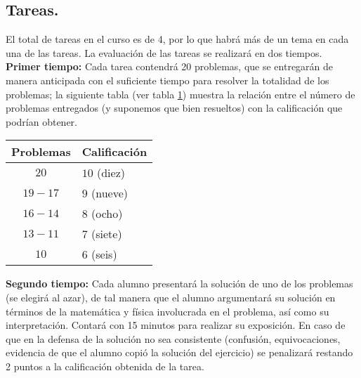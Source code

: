 \documentclass[12pt]{article}
\begin{document}
\subsection{Tareas.}
El total de tareas en el curso es de 4, por lo que habrá más de un tema en cada una de las tareas. La evaluación de las tareas se realizará en dos tiempos.
\\
\textbf{Primer tiempo:} Cada tarea contendrá 20 problemas, que se entregarán de manera anticipada con el suficiente tiempo para resolver la totalidad de los problemas; la siguiente tabla (ver tabla \ref{tab:relacion}) muestra la relación entre el número de problemas entregados (y suponemos que bien resueltos) con la calificación que podrían obtener.
\begin{table}[H]
\centering
\begin{tabular}{c | l}
\hline \hline 
Problemas & Calificación \\ [1ex] \hline
$20$ & $10$ (diez) \\ \hline
$19-17$ & $9$ (nueve) \\ \hline
$16-14$ & $8$ (ocho) \\ \hline
$13-11$  & $7$ (siete) \\ \hline
$10$ & $6$ (seis) \\ [1ex] \hline
\end{tabular}
\label{tab:relacion}
\end{table} 
\textbf{Segundo tiempo:} Cada alumno presentará la solución de uno de los problemas (se elegirá al azar), de tal manera que el alumno argumentará su solución en términos de la matemática y física involucrada en el problema, así como su interpretación. Contará con 15 minutos para realizar su exposición. En caso de que en la defensa de la solución no sea consistente (confusión, equivocaciones, evidencia de que el alumno copió la solución del ejercicio) se penalizará restando 2 puntos a la calificación obtenida de la tarea.
\end{document}
